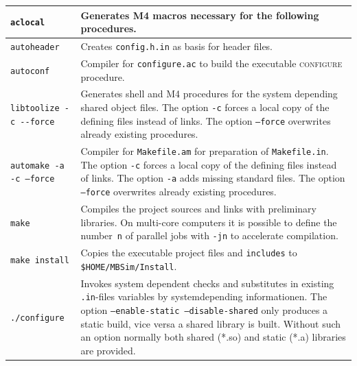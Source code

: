 	\begin{tabular}{|l|p{100mm}|}
	\hline
		\texttt{aclocal} & Generates M4 macros necessary for the following procedures.\\\hline
		\texttt{autoheader} & Creates \texttt{config.h.in} as basis for header files.\\\hline
		\texttt{autoconf} & Compiler for \texttt{configure.ac} to build the executable \textsc{configure} procedure.\\\hline
		\verb|libtoolize -c --force| & Generates shell and M4 procedures for the system depending shared object files. The option \texttt{-c} forces a local copy of the defining files instead of links. The option \texttt{--force} overwrites already existing procedures.\\\hline
		\texttt{automake -a -c --force} & Compiler for \texttt{Makefile.am} for preparation of \texttt{Makefile.in}. The option \texttt{-c} forces a local copy of the defining files instead of links. The option \texttt{-a} adds missing standard files. The option \texttt{--force} overwrites already existing procedures.\\\hline
		\texttt{make} & Compiles the project sources and links with preliminary libraries. On multi-core computers it is possible to define the number~\texttt{n} of parallel jobs with \texttt{-jn} to accelerate compilation.\\\hline
		\texttt{make install} & Copies the executable project files and \texttt{includes} to \texttt{\$HOME/MBSim/Install}.\\\hline 
        \texttt{./configure} & Invokes system dependent checks and substitutes in existing \texttt{.in}-files variables by systemdepending informationen. The option \texttt{--enable-static --disable-shared} only produces a static build, vice versa a shared library is built. Without such an option normally both shared (*.so) and static (*.a) libraries are provided.\\\hline
	\end{tabular}

